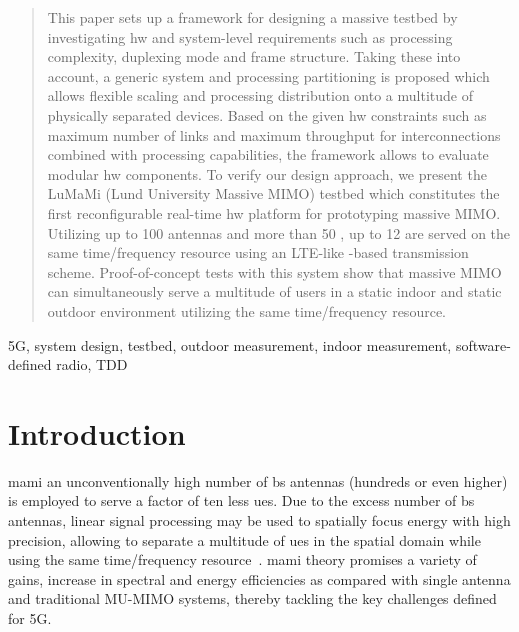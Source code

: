 \documentclass[journal]{IEEEtran}
\begin{document}
%
%

%

%
\maketitle

%
%
\begin{abstract}
%
%
This paper sets up a framework for designing a massive  testbed by investigating \gls{hw} and system-level requirements such as processing complexity, duplexing mode and frame structure.
Taking these into account, a generic system and processing partitioning is proposed which allows flexible scaling and processing distribution onto a multitude of physically separated devices.
Based on the given \gls{hw} constraints such as maximum number of links and maximum throughput for  interconnections combined with processing capabilities, the framework allows to evaluate modular \gls{hw} components.
%
To verify our design approach, we present the LuMaMi (Lund University Massive MIMO) testbed which constitutes the first reconfigurable real-time \gls{hw} platform for prototyping massive MIMO.
Utilizing up to 100  antennas and more than 50 , up to 12  are served on the same time/frequency resource using an LTE-like  -based transmission scheme.
Proof-of-concept tests with this system show that massive MIMO can simultaneously serve a multitude of users in a static indoor and static outdoor environment utilizing the same time/frequency resource.
\end{abstract}
%
\glsresetall
%
\begin{IEEEkeywords}
5G, system design, testbed, outdoor measurement, indoor measurement, software-defined radio, TDD 
\end{IEEEkeywords}






%
%
%
%
%
%
%
%
\IEEEpeerreviewmaketitle


\section{Introduction}
%
%
%
%
%

%
 \gls{mami} an unconventionally high number of \gls{bs} antennas (hundreds or even higher) is employed to serve \eg a factor of ten less \glspl{ue}.
Due to the excess number of \gls{bs} antennas, linear signal processing may be used to spatially focus energy with high precision, allowing to separate a multitude of \glspl{ue} in the spatial domain while using the same time/frequency resource~\cite{Marzetta2010}. 
\Gls{mami} theory promises a variety of gains, \eg increase in spectral and energy efficiencies as compared with single antenna and traditional MU-MIMO systems\cite{rusek2013,Rate}, thereby tackling the key challenges defined for 5G.
 
\end{document}

